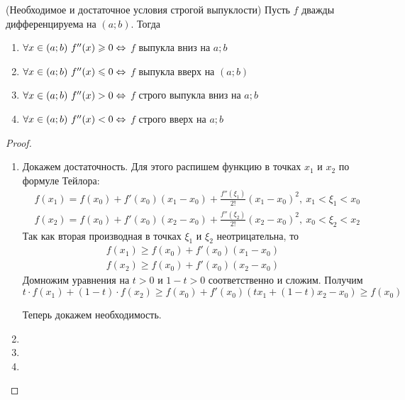 \begin{theorem} (Необходимое и достаточное условия строгой выпуклости)
	Пусть $f$ дважды дифференцируема на $(a; b)$. Тогда
	\begin{enumerate}
		\item $\forall x \in (a; b)\ f''(x) \geqslant 0 \Leftrightarrow$ $f$ выпукла вниз на $a; b$
		
		\item $\forall x \in (a; b)\ f''(x) \leqslant 0 \Leftrightarrow$ $f$ выпукла вверх на $(a; b)$
		
		\item $\forall x \in (a; b)\ f''(x) > 0 \Leftrightarrow$ $f$ строго выпукла вниз на $a; b$
		
		\item $\forall x \in (a; b)\ f''(x) < 0 \Leftrightarrow$ $f$ строго вверх на $a; b$
	\end{enumerate}
\end{theorem}

\begin{proof}~
	\begin{enumerate}
		\item Докажем достаточность. Для этого распишем функцию в точках $x_1$ и $x_2$ по формуле Тейлора:
		\begin{align*}
			&f(x_1) = f(x_0) + f'(x_0)(x_1 - x_0) + \frac{f''(\xi_1)}{2!}(x_1 - x_0)^2,\ x_1 < \xi_1 < x_0
			\\
			&f(x_2) = f(x_0) + f'(x_0)(x_2 - x_0) + \frac{f''(\xi_2)}{2!}(x_2 - x_0)^2,\ x_0 < \xi_2 < x_2
		\end{align*}
		Так как вторая производная в точках $\xi_1$ и $\xi_2$ неотрицательна, то
		\begin{align*}
			f(x_1) \ge f(x_0) + f'(x_0)(x_1 - x_0)
			\\
			f(x_2) \ge f(x_0) + f'(x_0)(x_2 - x_0)
		\end{align*}
		Домножим уравнения на $t > 0$ и $1 - t > 0$ соответственно и сложим. Получим
		\[
			t \cdot f(x_1) + (1 - t) \cdot f(x_2) \ge f(x_0) + f'(x_0)\left(tx_1 + (1 - t)x_2 - x_0\right) \ge f(x_0)
		\]
		
		Теперь докажем необходимость.
		\item 
		
		\item 
		
		\item 
	\end{enumerate}
\end{proof}